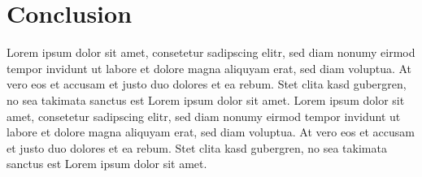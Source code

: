\documentclass[a4paper]{article}
\begin{document}
\section{Conclusion} %
\label{sec:conclusion}
Lorem ipsum dolor sit amet, consetetur sadipscing elitr, sed diam nonumy eirmod tempor invidunt ut labore et dolore magna aliquyam erat, sed diam voluptua. At vero eos et accusam et justo duo dolores et ea rebum. Stet clita kasd gubergren, no sea takimata sanctus est Lorem ipsum dolor sit amet. Lorem ipsum dolor sit amet, consetetur sadipscing elitr, sed diam nonumy eirmod tempor invidunt ut labore et dolore magna aliquyam erat, sed diam voluptua. At vero eos et accusam et justo duo dolores et ea rebum. Stet clita kasd gubergren, no sea takimata sanctus est Lorem ipsum dolor sit amet.


\newpage 


\end{document}
